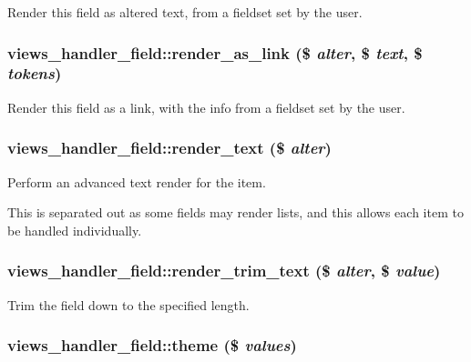 Render this field as altered text, from a fieldset set by the user. \hypertarget{classviews__handler__field_44eafd927c2a6d93af234f69e8560078}{
\subsubsection[{render\_\-as\_\-link}]{\setlength{\rightskip}{0pt plus 5cm}views\_\-handler\_\-field::render\_\-as\_\-link (\$ {\em alter}, \/  \$ {\em text}, \/  \$ {\em tokens})}}
\label{classviews__handler__field_44eafd927c2a6d93af234f69e8560078}


Render this field as a link, with the info from a fieldset set by the user. \hypertarget{classviews__handler__field_1d6e3f832a9a22410029e79cd9cfc32e}{
\subsubsection[{render\_\-text}]{\setlength{\rightskip}{0pt plus 5cm}views\_\-handler\_\-field::render\_\-text (\$ {\em alter})}}
\label{classviews__handler__field_1d6e3f832a9a22410029e79cd9cfc32e}


Perform an advanced text render for the item.

This is separated out as some fields may render lists, and this allows each item to be handled individually. \hypertarget{classviews__handler__field_a2c5f49595a97848d523338a5c64a7c6}{
\subsubsection[{render\_\-trim\_\-text}]{\setlength{\rightskip}{0pt plus 5cm}views\_\-handler\_\-field::render\_\-trim\_\-text (\$ {\em alter}, \/  \$ {\em value})}}
\label{classviews__handler__field_a2c5f49595a97848d523338a5c64a7c6}


Trim the field down to the specified length. \hypertarget{classviews__handler__field_31b777437d94e4904c546e3bb0d76c16}{
\subsubsection[{theme}]{\setlength{\rightskip}{0pt plus 5cm}views\_\-handler\_\-field::theme (\$ {\em values})}}
\label{classviews__handler__field_31b777437d94e4904c546e3bb0d76c16}



